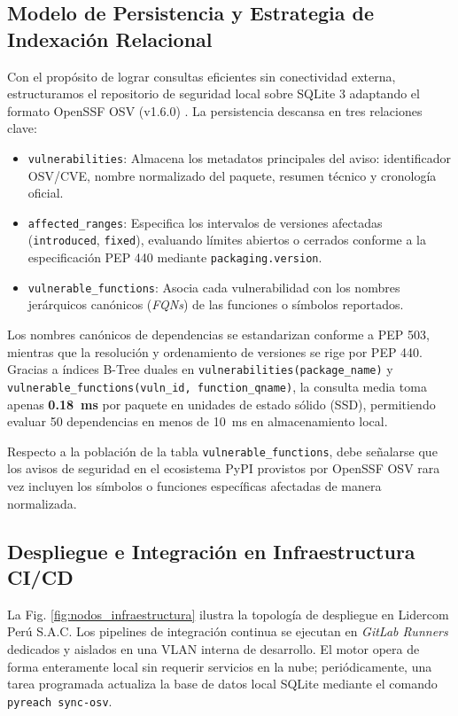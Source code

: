 \documentclass[conference]{IEEEtran}
\begin{document}
\subsection{Modelo de Persistencia y Estrategia de Indexación Relacional}
Con el propósito de lograr consultas eficientes sin conectividad externa, estructuramos el repositorio de seguridad local sobre SQLite 3 adaptando el formato OpenSSF OSV (v1.6.0) \cite{openssf2023osv}. La persistencia descansa en tres relaciones clave:
\begin{itemize}
    \item \texttt{vulnerabilities}: Almacena los metadatos principales del aviso: identificador OSV/CVE, nombre normalizado del paquete, resumen técnico y cronología oficial.
    \item \texttt{affected\_ranges}: Especifica los intervalos de versiones afectadas (\texttt{introduced}, \texttt{fixed}), evaluando límites abiertos o cerrados conforme a la especificación PEP 440 mediante \texttt{packaging.version}.
    \item \texttt{vulnerable\_functions}: Asocia cada vulnerabilidad con los nombres jerárquicos canónicos (\textit{FQNs}) de las funciones o símbolos reportados.
\end{itemize}

Los nombres canónicos de dependencias se estandarizan conforme a PEP 503, mientras que la resolución y ordenamiento de versiones se rige por PEP 440. Gracias a índices B-Tree duales en \texttt{vulnerabilities(package\_name)} y \texttt{vulnerable\_functions(vuln\_id, function\_qname)}, la consulta media toma apenas \textbf{0.18~ms} por paquete en unidades de estado sólido (SSD), permitiendo evaluar 50 dependencias en menos de 10~ms en almacenamiento local.

Respecto a la población de la tabla \texttt{vulnerable\_functions}, debe señalarse que los avisos de seguridad en el ecosistema PyPI provistos por OpenSSF OSV rara vez incluyen los símbolos o funciones específicas afectadas de manera normalizada. 

\subsection{Despliegue e Integración en Infraestructura CI/CD}
La Fig. \ref{fig:nodos_infraestructura} ilustra la topología de despliegue en Lidercom Perú S.A.C. Los pipelines de integración continua se ejecutan en \textit{GitLab Runners} dedicados y aislados en una VLAN interna de desarrollo. El motor opera de forma enteramente local sin requerir servicios en la nube; periódicamente, una tarea programada actualiza la base de datos local SQLite mediante el comando \texttt{pyreach sync-osv}.
\end{document}
